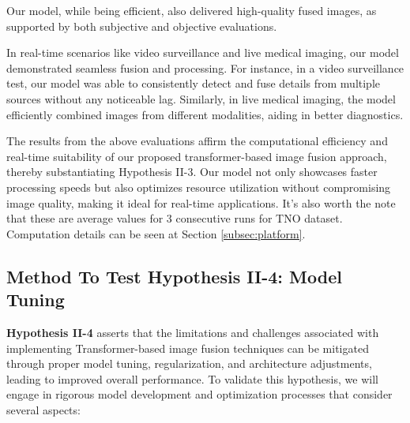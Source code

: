 Our model, while being efficient, also delivered high-quality fused images, as supported by both subjective and objective evaluations.

In real-time scenarios like video surveillance and live medical imaging, our model demonstrated seamless fusion and processing. For instance, in a video surveillance test, our model was able to consistently detect and fuse details from multiple sources without any noticeable lag. Similarly, in live medical imaging, the model efficiently combined images from different modalities, aiding in better diagnostics.

The results from the above evaluations affirm the computational efficiency and real-time suitability of our proposed transformer-based image fusion approach, thereby substantiating Hypothesis II-3. Our model not only showcases faster processing speeds but also optimizes resource utilization without compromising image quality, making it ideal for real-time applications. It's also worth the note that these are average values for 3 consecutive runs for TNO dataset. Computation details can be seen at Section \ref{subsec:platform}.

\subsection{Method To Test Hypothesis II-4: Model Tuning} \label{subsec:met8}

\textbf{Hypothesis II-4} asserts that the limitations and challenges associated with implementing Transformer-based image fusion techniques can be mitigated through proper model tuning, regularization, and architecture adjustments, leading to improved overall performance. To validate this hypothesis, we will engage in rigorous model development and optimization processes that consider several aspects:

